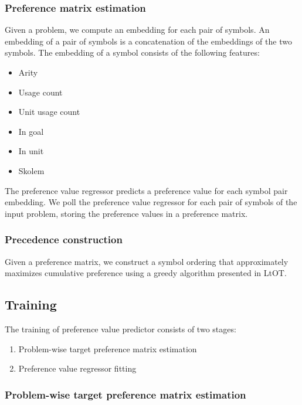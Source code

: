 \subsubsection{Preference matrix estimation}

Given a problem, we compute an embedding for each pair of symbols.
An embedding of a pair of symbols is a concatenation of the embeddings of the two symbols.
The embedding of a symbol consists of the following features:

\begin{itemize}
	\item Arity
	\item Usage count
	\item Unit usage count
	\item In goal
	\item In unit
	\item Skolem
\end{itemize}

The preference value regressor predicts a preference value for each symbol pair embedding.
We poll the preference value regressor for each pair of symbols of the input problem,
storing the preference values in a preference matrix.

\subsubsection{Precedence construction}

Given a preference matrix, we construct a symbol ordering
that approximately maximizes cumulative preference
using a greedy algorithm presented in LtOT.

\subsection{Training}

The training of preference value predictor consists of two stages:

\begin{enumerate}
	\item Problem-wise target preference matrix estimation
	\item Preference value regressor fitting
\end{enumerate}

\subsubsection{Problem-wise target preference matrix estimation}


